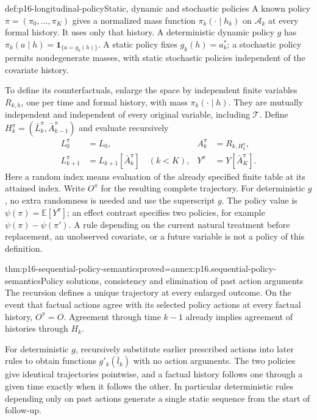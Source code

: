 \begin{hbdefinition}{def:p16-longitudinal-policy}{Static, dynamic and stochastic policies}
A known policy \(\pi=(\pi_0,\ldots,\pi_K)\) gives a normalized
mass function \(\pi_k(\cdot\mid h_k)\) on \(\mathcal A_k\) at
every formal history. It uses only that history. A deterministic dynamic
policy \(g\) has \(\pi_k(a\mid h)=\mathbf1_{\{a=g_k(h)\}}\).
A static policy fixes \(g_k(h)=a_k^*\); a stochastic policy permits
nondegenerate masses, with static stochastic policies independent of the
covariate history.

To define its counterfactuals, enlarge the space by independent finite
variables \(R_{k,h}\), one per time and formal history, with mass
\(\pi_k(\cdot\mid h)\). They are mutually independent and independent
of every original variable, including \(\mathcal T\). Define
\(H_k^\pi=(\bar L_k^\pi,\bar A_{k-1}^\pi)\) and evaluate recursively
\[
\begin{aligned}
 L_0^\pi&=L_0,& A_k^\pi&=R_{k,H_k^\pi},\\
 L_{k+1}^\pi&=L_{k+1}[\bar A_k^\pi]\quad(k<K),&
 Y^\pi&=Y[\bar A_K^\pi].
\end{aligned}
\]
Here a random index means evaluation of the already specified finite table
at its attained index. Write \(O^\pi\) for the resulting complete trajectory.
For deterministic \(g\), no extra randomness is needed and use the superscript
\(g\). The policy value is \(\psi(\pi)=\mathbb E[Y^\pi]\);
an effect contrast specifies two policies, for example
\(\psi(\pi)-\psi(\pi')\). A rule depending on the current natural treatment
before replacement, an unobserved covariate, or a future variable is not a
policy of this definition.
\end{hbdefinition}

\begin{hbtheorem}{thm:p16-sequential-policy-semantics}{proved=annex:p16.sequential-policy-semantics}{Policy solutions, consistency and elimination of past action arguments}
The recursion defines a unique trajectory at every enlarged outcome.
On the event that factual actions agree with its selected policy actions
at every factual history, \(O^\pi=O\). Agreement through time \(k-1\)
already implies agreement of histories through \(H_k\).

For deterministic \(g\), recursively substitute earlier prescribed actions
into later rules to obtain functions \(g'_k(\bar l_k)\) with no action
arguments. The two policies give identical trajectories pointwise, and a
factual history follows one through a given time exactly when it follows
the other. In particular deterministic rules depending only on past
actions generate a single static sequence from the start of follow-up.
\end{hbtheorem}

